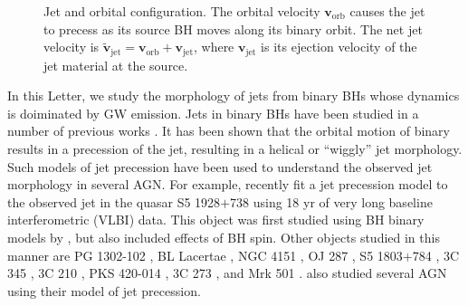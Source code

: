 \documentclass[a4paper,fleqn,usenatbib]{mnras}
\begin{document}
\begin{figure}
  \begin{center}
  \end{center}
  \caption{Jet and orbital configuration. The orbital velocity
    $\mathbf{v}_\mathrm{orb}$ causes the jet to precess as its source
    BH moves along its binary orbit. The net jet velocity is
    $\tilde{\mathbf{v}}_\mathrm{jet}={\mathbf{v}}_\mathrm{orb}+{\mathbf{v}}_\mathrm{jet}$,
    where $\mathbf{v}_\mathrm{jet}$ is its ejection velocity of the
    jet material at the source.}
  \label{fig:BH_orbit}
\end{figure}

In this Letter, we study the morphology of jets from binary BHs whose
dynamics is doiminated by GW emission.  Jets in binary BHs have been
studied in a number of previous works \citep{1980ApJ...238L.129S,
  1981ApJ...246L..65I, 1981ApJ...246L.141H, 1982ApJ...258L..63G,
  1982ApJ...253L...1G, 1982ApJ...262..478G}.  It has been shown that
the orbital motion of binary results in a precession of the jet,
resulting in a helical or ``wiggly'' jet morphology.  Such models of
jet precession have been used to understand the observed jet
morphology in several AGN.  For example, recently
\citet{2014MNRAS.445.1370K} fit a jet precession model to the observed
jet in the quasar S5 1928$+$738 using 18 yr of very long baseline
interferometric (VLBI) data.  This object was first studied using BH
binary models by \citet{1993ApJ...409..130R}, but
\citet{2014MNRAS.445.1370K} also included effects of BH spin.  Other
objects studied in this manner are PG 1302-102
\citep{2015MNRAS.454.1290K, 2015Natur.518...74G}, BL Lacertae
\citep{2003MNRAS.341..405S, 2013MNRAS.428..280C}, NGC 4151
\citep{2012ApJ...759..118B}, OJ 287 \citep{2012MNRAS.421.1861V}, S5
1803$+$784 \citep{2008A&A...483..125R}, 3C 345
\citep{2005A&A...431..831L}, 3C 210 \citep{2004MNRAS.349.1218C}, PKS
420-014 \citep{2001A&A...374..784B}, 3C 273
\citep{2000A&A...360...57R}, and Mrk 501 \citep{1999A&A...347...30V}.
\citet{1982ApJ...262..478G} also studied several AGN using their model
of jet precession.
\end{document}
